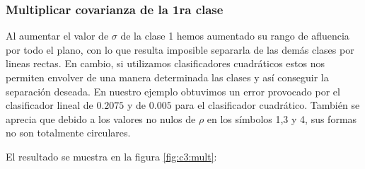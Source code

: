 \documentclass[11pt]{article} %
\begin{document}
\newpage
\subsubsection{Multiplicar covarianza de la 1ra clase}

Al aumentar el valor de $\sigma$ de la clase 1 hemos aumentado su rango de afluencia por todo el plano, con lo que resulta imposible separarla de las demás clases por lineas rectas. En cambio, si utilizamos clasificadores cuadráticos estos nos permiten envolver de una manera determinada las clases y así conseguir la separación deseada. En nuestro ejemplo obtuvimos un error provocado por el clasificador lineal de $0.2075$ y de $0.005$ para el clasificador cuadrático. También se aprecia que debido a los valores no nulos de $\rho$ en los símbolos 1,3 y 4, sus formas no son totalmente circulares.

El resultado se muestra en la figura \ref{fig:c3:mult}:
\end{document}
